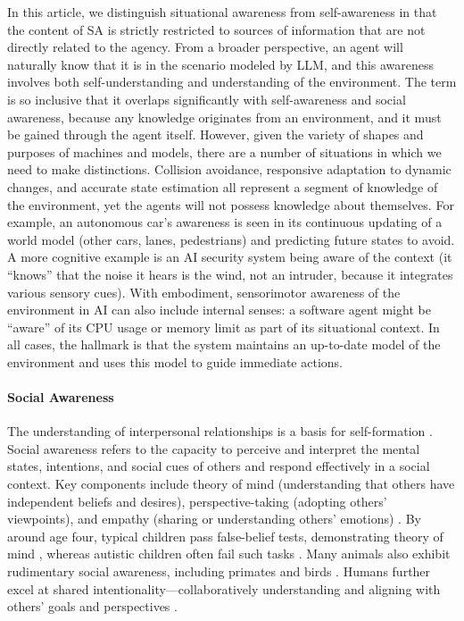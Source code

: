 In this article, we distinguish situational awareness from self-awareness in that the content of SA is strictly restricted to sources of information that are not directly related to the agency. From a broader perspective, an agent will naturally know that it is in the scenario modeled by LLM, and this awareness involves both self-understanding and understanding of the environment. The term is so inclusive that it overlaps significantly with self-awareness and social awareness, because any knowledge originates from an environment, and it must be gained through the agent itself. However, given the variety of shapes and purposes of machines and models, there are a number of situations in which we need to make distinctions. Collision avoidance, responsive adaptation to dynamic changes, and accurate state estimation all represent a segment of knowledge of the environment, yet the agents will not possess knowledge about themselves. For example, an autonomous car's awareness is seen in its continuous updating of a world model (other cars, lanes, pedestrians) and predicting future states to avoid. A more cognitive example is an AI security system being aware of the context (it ``knows'' that the noise it hears is the wind, not an intruder, because it integrates various sensory cues). With embodiment, sensorimotor awareness of the environment in AI can also include internal senses: a software agent might be ``aware'' of its CPU usage or memory limit as part of its situational context. In all cases, the hallmark is that the system maintains an up-to-date model of the environment and uses this model to guide immediate actions.

\paragraph{Social Awareness}

The understanding of interpersonal relationships is a basis for self-formation \citep{baumeister2010self}. Social awareness refers to the capacity to perceive and interpret the mental states, intentions, and social cues of others and respond effectively in a social context. Key components include theory of mind (understanding that others have independent beliefs and desires), perspective-taking (adopting others' viewpoints), and empathy (sharing or understanding others' emotions) \citep{Premack1978,Preston2002,Abbo2024}. By around age four, typical children pass false-belief tests, demonstrating theory of mind \citep{Wimmer1983}, whereas autistic children often fail such tasks \citep{BaronCohen1985}. Many animals also exhibit rudimentary social awareness, including primates \citep{Premack1978} and birds \citep{krupenye2019theory}. Humans further excel at shared intentionality—collaboratively understanding and aligning with others' goals and perspectives \citep{Tomasello2005}.

